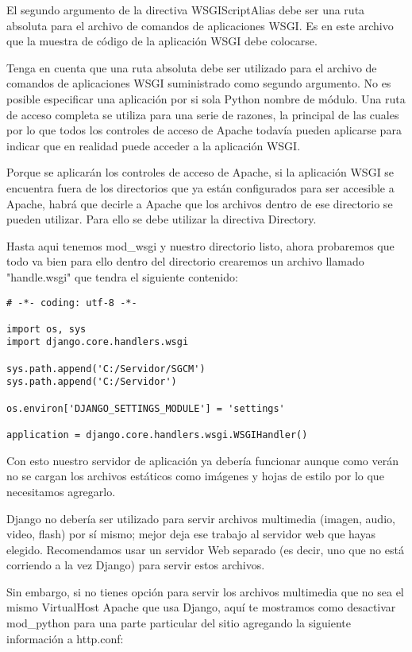 El segundo argumento de la directiva WSGIScriptAlias debe ser una ruta absoluta para el archivo de comandos de aplicaciones WSGI. Es en este archivo que la muestra de código de la aplicación WSGI debe colocarse.

Tenga en cuenta que una ruta absoluta debe ser utilizado para el archivo de comandos de aplicaciones WSGI suministrado como segundo argumento. No es posible especificar una aplicación por si  sola Python nombre de módulo. Una ruta de acceso completa se utiliza para una serie de razones, la principal de las cuales por lo que todos los controles de acceso de Apache todavía pueden aplicarse para indicar que en realidad puede acceder a la aplicación WSGI.

Porque se aplicarán los controles de acceso de Apache, si la aplicación WSGI se  encuentra fuera de los directorios que ya están configurados para ser accesible a Apache, habrá que decirle a Apache que los archivos dentro de ese directorio se   pueden utilizar. Para ello se debe utilizar la directiva Directory.

Hasta aqui tenemos mod\_wsgi y nuestro directorio listo, ahora probaremos que todo va bien para ello dentro del directorio crearemos un archivo llamado "handle.wsgi" que tendra el siguiente contenido:

\begin{lstlisting}[style=Python]
# -*- coding: utf-8 -*-

import os, sys
import django.core.handlers.wsgi

sys.path.append('C:/Servidor/SGCM')
sys.path.append('C:/Servidor')

os.environ['DJANGO_SETTINGS_MODULE'] = 'settings'

application = django.core.handlers.wsgi.WSGIHandler()

\end{lstlisting}
\vspace{0.1cm}


Con esto nuestro servidor de aplicación ya debería funcionar aunque como verán no se cargan los archivos estáticos como imágenes y hojas de estilo por lo que necesitamos agregarlo.

Django no debería ser utilizado para servir archivos multimedia (imagen, audio, video, flash) por sí mismo; mejor deja ese trabajo al servidor web que hayas elegido. Recomendamos usar un servidor Web separado (es decir, uno que no está corriendo a la vez Django) para servir estos archivos. 

Sin embargo, si no tienes opción para servir los archivos multimedia que no sea el mismo VirtualHost Apache que usa Django, aquí te mostramos como desactivar mod\_python para una parte particular del sitio agregando la siguiente información a http.conf:

